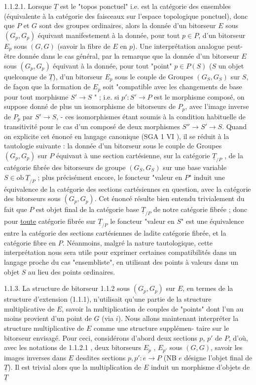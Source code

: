 1.1.2.1.  Lorsque $\underline{T}$ est le "topos ponctuel" i.e. est la catégorie des ensembles (équivalente à la catégorie des faisceaux sur l'espace topologique ponctuel), donc que $P$ et $G$ sont des groupes ordinaires, alors la donnée d'un bitorseur $E$ sous  $(G_p,G_p)$  équivaut manifestement à la donnée, pour tout $p \in P$, d'un bitorseur $E_p$ sous $(G,G)$ (savoir la fibre de $E$ en $p$). Une interprétation analogue peut-être donnée dans le cas général, par la remarque que la donnée d'un bitorseur $E$ sous $(G_p,G_p)$ équivaut à la donnée, pour tout "point" $p \in P(S)$ ($S$ un objet quelconque de $\underline{T}$), d'un bitorseur $E_p$ sous
le couple de Groupes $(G_S,G_S)$ sur $S$, de façon que la formation de $E_p$ soit "compatible avec les changements de base pour tout morphisme $S' \longrightarrow S$ " ; i.e. si $p' : S' \longrightarrow P$ est le morphisme composé, on suppose donné de plus un isomorphisme de bitorseurs de $P_p$, avec l'image inverse de $P_p$ par $S' \longrightarrow S$, - ces isomorphismes étant soumis à la condition habituelle de transitivité pour le cas d'un composé de deux morphismes $S'' \longrightarrow S' \longrightarrow S$. Quand on explicite cet énoncé en langage canonique (SGA 1 VI    ), il se réduit à la tautologie suivante : la donnée d'un bitorseur sous le couple de Groupes $(G_p,G_p)$ sur $P$ équivaut à une section cartésienne, sur la catégorie $\underline{T}_{/P}$ , de la catégorie fibrée des bitorseurs de groupe $(G_S,G_S)$ sur une base variable $S \in \mathrm{ob}\ \underline{T}_{/P}$ ; plus précisément encore, le foncteur "valeur en $P$" induit une équivalence de la catégorie des sections cartésiennes en question, avec la catégorie des bitorseurs sous $(G_p,G_p)$. Cet énoncé résulte bien entendu trivialement du fait que $P$ est objet final de la catégorie base $\underline{T}_{/P}$ de notre catégorie fibrée ; donc pour \underline{toute} catégorie fibrée sur $\underline{T}_{/P}$ le foncteur "valeur en $S$" est une équivalence entre la catégorie des sections cartésiennes de ladite catégorie fibrée, et la catégorie fibre en $P$. Néanmoins, malgré la nature tautologique, cette interprétation nous sera utile pour exprimer certaines compatibilités dans un langage proche du cas "ensembliste", en utilisant des points à valeurs dans un objet $S$ au lieu des points ordinaires.

1.1.3.  La structure de bitorseur 1.1.2 sous $(G_p,G_p)$ sur $E$, en termes de la structure d'extension (1.1.1), n'utilisait qu'une partie de la structure multiplicative de $E$, savoir la multiplication de couples de "points" dont l'un au moins provient d'un point de $G$ (via $i$). Nous allons maintenant interpréter la structure multiplicative de $E$ comme une structure supplémen-
taire sur le bitorseur envisagé. Pour ceci, considérons d'abord deux sections $p$, $p'$ de $P$, d'où, avec les notations de 1.1.2.1 , deux bitorseurs $E_p$ , $E_{p'}$ sous $(G,G)$, savoir les images inverses dans $E$ desdites sections $p,p' : e \longrightarrow P$ (NB $e$ désigne l'objet final de $\underline{T}$). Il est trivial alors que la multiplication de $E$ induit un morphisme d'objets de $\underline{T}$

